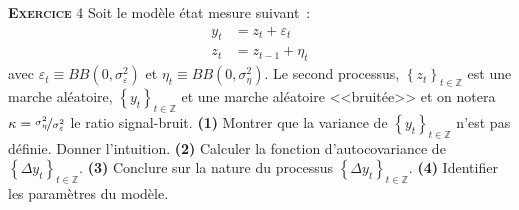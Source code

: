 \documentclass[10pt,a4paper,notitlepage,twocolumn]{article}
\newcommand{\exercice}[1]{\textsc{\textbf{Exercice}} #1}
\newcommand{\question}[1]{\textbf{(#1)}}
\begin{document}
\bigskip
\bigskip

\exercice{4} Soit le modèle état mesure suivant :
\[
  \begin{split}
    y_t &= z_t + \varepsilon_t\\
    z_t &= z_{t-1} + \eta_t
  \end{split}
\]
avec $\varepsilon_t \equiv BB(0,\sigma_{\varepsilon}^2)$ et
$\eta_t \equiv BB(0,\sigma_{\eta}^2)$. Le second processus,
$\left\{z_t\right\}_{t\in \mathbb Z}$ est une marche aléatoire,
$\left\{y_t\right\}_{t\in \mathbb Z}$ et une marche aléatoire
<<bruitée>> et on notera
$\kappa = \nicefrac{\sigma_{\eta}^2}{\sigma_{\varepsilon}^2}$ le ratio
signal-bruit. \question{1} Montrer que la variance de
$\left\{y_t\right\}_{t\in \mathbb Z}$ n'est pas définie. Donner
l'intuition. \question{2} Calculer la fonction d'autocovariance de
$\left\{\Delta y_t\right\}_{t\in \mathbb Z}$. \question{3} Conclure
sur la nature du processus
$\left\{\Delta y_t\right\}_{t\in \mathbb Z}$. \question{4} Identifier
les paramètres du modèle.
\end{document}

